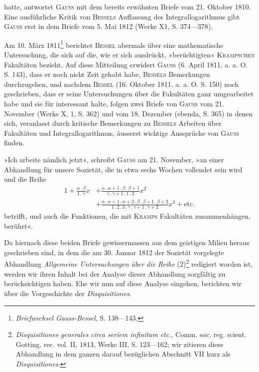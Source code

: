 hatte, antwortet \textsc{Gauss} mit dem bereits erwähnten Briefe vom 21. Oktober
1810. Eine ausführliche Kritik von \textsc{Bessels} Auffassung des Integrallogarithmus
gibt \textsc{Gauss} erst in dem Briefe vom 5. Mai 1812 (Werke X1,
S. 374—378).
\par
Am 10. März 1811\footnote{\textit{Briefwechsel Gauss-Bessel}, S. 138—143.} berichtet \textsc{Bessel} abermals über eine mathematische
Untersuchung, die sich auf die, wie er sich ausdrückt, »berüchtigten« \textsc{Krampschen}
Fakultäten bezieht. Auf diese Mitteilung erwidert \textsc{Gauss} (6. April 1811,
a. a. O. S. 143), dass er noch nicht Zeit gehabt habe, \textsc{Bessels} Bemerkungen
durchzugehen, und nachdem \textsc{Bessel} (16. Oktober 1811, a. a. O. S. 150) noch
geschrieben, dass er seine Untersuchungen über die Fakultäten ganz umgearbeitet
habe und sie für interessant halte, folgen zwei Briefe von \textsc{Gauss} vom
21. November (Werke X, 1, S. 362) und vom 18. Dezember (ebenda, S. 365) in
denen sich, veranlasst durch kritische Bemerkungen zu \textsc{Bessels} Arbeiten über
Fakultäten und Integrallogarithmus, äusserst wichtige Aussprüche von \textsc{Gauss}
finden.
\par
»Ich arbeite nämlich jetzt«, schreibt \textsc{Gauss} am 21. November, »an einer
Abhandlung für unsere Sozietät, die in etwa sechs Wochen vollendet sein
wird und die Reihe
\begingroup\makeatletter\tagsleft@true\let\veqno\leqno\makeatother
\begin{equation*}
\begin{aligned}
1+\frac{\alpha\mathbin{.}\beta}{1\mathbin{.}\gamma}x
&+\frac{\alpha\mathbin{.}\alpha+1\mathbin{.}\beta\mathbin{.}\beta+1}
{\gamma\mathbin{.}\gamma+1\mathbin{.}1\mathbin{.}2}x^2\\
&+\frac{\alpha\mathbin{.}\alpha+1\mathbin{.}\alpha+2\mathbin{.}\beta\mathbin{.}\beta+1\mathbin{.}\beta+2}
{1\mathbin{.}2\mathbin{.}3\mathbin{.}\gamma\mathbin{.}\gamma+1\mathbin{.}\gamma+2}x^3+\text{etc.}
\end{aligned}\tag{2}
\end{equation*}\endgroup
\noindent betrifft, und auch die Funktionen, die mit \textsc{Kramps} Fakultäten zusammenhängen,
berührt«.
\par
\clearpage{}
\indent Da hiernach diese beiden Briefe gewissermassen aus dem geistigen Milieu
heraus geschrieben sind, in dem die am 30. Januar 1812 der Sozietät vorgelegte
Abhandlung \textit{Allgemeine Untersuchungen über die Reihe} (2)\footnote{\textit{Disquisitiones generales circa seriem infinitam etc.}, Comm. soc. reg. scient. Gotting. rec. vol. II, 1813, Werke III, S. 123—162; wir zitieren diese Abhandlung in dem ganzen darauf bezüglichen Abschnitt VII kurz als \textit{Disquisitiones}.} redigiert
worden ist, werden wir ihren Inhalt bei der Analyse dieser Abhandlung sorgfältig
zu berücksichtigen haben. Ehe wir nun auf diese Analyse eingehen,
berichten wir über die Vorgeschichte der \textit{Disquisitiones}.
